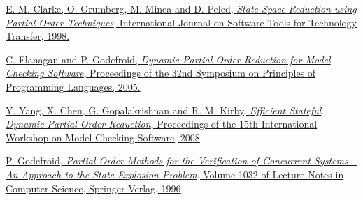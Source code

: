 \documentclass[12pt,a4paper,twoside]{article}
\begin{document}
\begin{thebibliography}{9}
	
	\href{https://www.cs.cmu.edu/~emc/15-820A/reading/partial-order.pdf}{
		E. M. Clarke, O. Grumberg, M. Minea and D. Peled,
		\emph{State Space Reduction using Partial Order Techniques},
		International Journal on Software Tools for Technology Transfer,
		1998.
	}
	
	\href{https://users.soe.ucsc.edu/~cormac/papers/popl05.pdf}{
		C. Flanagan and P. Godefroid,
		\emph{Dynamic Partial Order Reduction
			for Model Checking Software},
		Proceedings of the 32nd Symposium on Principles of Programming Languages,
		2005.
	}
	
	\href{http://www.cs.utah.edu/~yuyang/papers/spin08.pdf}{
		Y. Yang, X. Chen, G. Gopalakrishnan and R. M. Kirby,
		\emph{Efficient Stateful Dynamic Partial Order Reduction},
		Proceedings of the 15th International Workshop on Model Checking Software,
		2008
	}
	
	\href{http://link.springer.com/book/10.1007%2F3-540-60761-7}{
		P. Godefroid,
		\emph{Partial-Order Methods for the Verification of
			Concurrent Systems -- An Approach to the State-Explosion
			Problem},
		 Volume 1032 of Lecture Notes in Computer
		 Science, Springer-Verlag,
		 1996
	}

\end{thebibliography}
\end{document}
